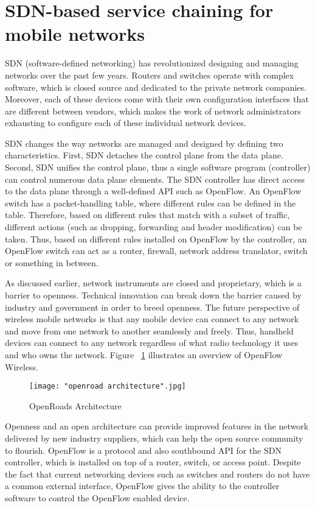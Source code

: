 \section{SDN-based service chaining for mobile networks}

SDN (software-defined networking) has revolutionized designing and managing networks over the past few years. Routers and switches operate with complex software, which is closed source and dedicated to the private network companies. Moreover, each of these devices come with their own configuration interfaces that are different between vendors, which makes the work of network administrators exhausting to configure each of these individual network devices. \cite{FRZ13}

SDN changes the way networks are managed and designed by defining two characteristics. First, SDN detaches the control plane from the data plane. Second, SDN unifies the control plane, thus a single software program (controller) can control numerous data plane elements. The SDN controller has direct access to the data plane through a well-defined API such as OpenFlow. An OpenFlow switch has a packet-handling table, where different rules can be defined in the table. Therefore, based on different rules that match with a subset of traffic, different actions (such as dropping, forwarding and header modification) can be taken. Thus, based on different rules installed on OpenFlow by the controller, an OpenFlow switch can act as a router, firewall, network address translator, switch or something in between. 

As discussed earlier, network instruments are closed and proprietary, which is a barrier to openness. Technical innovation can break down the barrier caused by industry and government in order to breed openness. The future perspective of wireless mobile networks is that any mobile device can connect to any network and move from one network to another seamlessly and freely. Thus, handheld devices can connect to any network regardless of what radio technology it uses and who owns the network. Figure ~\ref{fig:openroads} illustrates an overview of OpenFlow Wireless. \cite{Yap10a}

\begin{figure}[h!t]
\centering
{}
\texttt{[image: "openroad architecture".jpg]}
\caption{OpenRoads Architecture \cite{Yap10b}}
\label{fig:openroads}
\end{figure}

Openness and an open architecture can provide improved features in the network delivered by new industry suppliers, which can help the open source community to flourish. OpenFlow is a protocol and also southbound API for the SDN controller, which is installed on top of a router, switch, or access point. Despite the fact that current networking devices such as switches and routers do not have a common external interface, OpenFlow gives the ability to the controller software to control the OpenFlow enabled device. 

